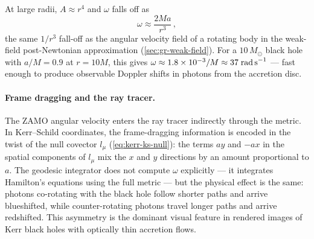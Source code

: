 At large radii, $A \approx r^4$ and $\omega$ falls off as
%
\begin{equation}
  \omega \approx \frac{2Ma}{r^3} \,,
  \label{eq:kerr-omega-far}
\end{equation}
%
the same $1/r^3$ fall-off as the angular velocity field of a
rotating body in the weak-field post-Newtonian approximation
(\cref{sec:gr-weak-field}).  For a
$10\,M_\odot$ black hole with $a/M = 0.9$ at $r = 10M$, this
gives $\omega \approx 1.8 \times 10^{-3}/M \approx 37\;\text{rad\,s}^{-1}$
--- fast enough to produce observable Doppler shifts in photons
from the accretion disc.

\paragraph{Frame dragging and the ray tracer.}

The ZAMO angular velocity enters the ray tracer indirectly through
the metric.  In Kerr--Schild coordinates, the frame-dragging
information is encoded in the twist of the null covector $l_\mu$
(\cref{eq:kerr-ks-null}): the terms $ay$ and $-ax$ in the
spatial components of $l_\mu$ mix the $x$ and $y$ directions by an
amount proportional to $a$.  The geodesic integrator does not
compute $\omega$ explicitly --- it integrates Hamilton's equations
using the full metric --- but the physical effect is the same:
photons co-rotating with the black hole follow shorter paths and
arrive blueshifted, while counter-rotating photons travel longer
paths and arrive redshifted.  This asymmetry is the dominant
visual feature in rendered images of Kerr black holes with
optically thin accretion flows.
